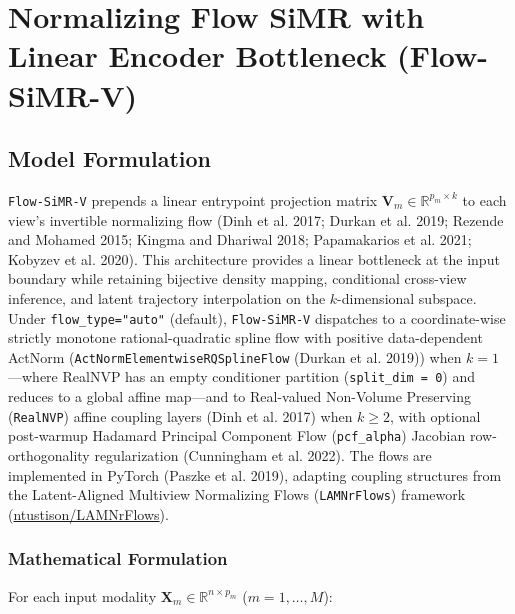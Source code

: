\documentclass[
  10pt,
  letterpaper,
]{report}
\begin{document}
\chapter{Normalizing Flow SiMR with Linear Encoder Bottleneck
(Flow-SiMR-V)}\label{sec-app-flow}

\section{Model Formulation}\label{model-formulation}

\texttt{Flow-SiMR-V} prepends a linear entrypoint projection matrix
\(\mathbf{V}_m \in \mathbb{R}^{p_m \times k}\) to each view's invertible
normalizing flow (Dinh et al. 2017; Durkan et al. 2019; Rezende and
Mohamed 2015; Kingma and Dhariwal 2018; Papamakarios et al. 2021;
Kobyzev et al. 2020). This architecture provides a linear bottleneck at
the input boundary while retaining bijective density mapping,
conditional cross-view inference, and latent trajectory interpolation on
the \(k\)-dimensional subspace. Under \texttt{flow\_type="auto"}
(default), \texttt{Flow-SiMR-V} dispatches to a coordinate-wise strictly
monotone rational-quadratic spline flow with positive data-dependent
ActNorm (\texttt{ActNormElementwiseRQSplineFlow} (Durkan et al. 2019))
when \(k = 1\)---where RealNVP has an empty conditioner partition
(\texttt{split\_dim\ =\ 0}) and reduces to a global affine map---and to
Real-valued Non-Volume Preserving (\texttt{RealNVP}) affine coupling
layers (Dinh et al. 2017) when \(k \ge 2\), with optional post-warmup
Hadamard Principal Component Flow (\texttt{pcf\_alpha}) Jacobian
row-orthogonality regularization (Cunningham et al. 2022). The flows are
implemented in PyTorch ({Paszke et al.} 2019), adapting coupling
structures from the Latent-Aligned Multiview Normalizing Flows
(\texttt{LAMNrFlows}) framework
(\href{https://github.com/ntustison/LAMNrFlows}{ntustison/LAMNrFlows}).

\subsection{Mathematical Formulation}\label{mathematical-formulation}

For each input modality \(\mathbf{X}_m \in \mathbb{R}^{n \times p_m}\)
(\(m = 1, \dots, M\)):
\end{document}
